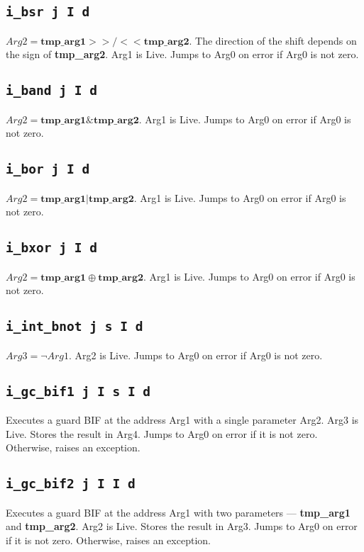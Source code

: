 \documentclass{article}
\newcommand{\tmpa}{\textbf{tmp\_arg1}}
\newcommand{\tmpb}{\textbf{tmp\_arg2}}
\newcommand{\iop}[1]{\texttt{#1}}
\begin{document}
\subsection*{\iop{i\_bsr j I d}}

$Arg2 = \tmpa{} >>/<< \tmpb{}$. The direction of the shift depends on the sign of
\tmpb{}. Arg1 is Live. Jumps to Arg0 on error if Arg0 is not zero.

\subsection*{\iop{i\_band j I d}}

$Arg2 = \tmpa{} \& \tmpb{}$. Arg1 is Live. Jumps to Arg0 on error if Arg0 is not
zero.

\subsection*{\iop{i\_bor j I d}}

$Arg2 = \tmpa{} | \tmpb{}$. Arg1 is Live. Jumps to Arg0 on error if Arg0 is not
zero.

\subsection*{\iop{i\_bxor j I d}}

$Arg2 = \tmpa{} \oplus \tmpb{}$. Arg1 is Live. Jumps to Arg0 on error if Arg0 is not
zero.

\subsection*{\iop{i\_int\_bnot j s I d}}

$Arg3 = \neg Arg1$. Arg2 is Live. Jumps to Arg0 on error if Arg0 is not zero.

\subsection*{\iop{i\_gc\_bif1 j I s I d}}

Executes a guard BIF at the address Arg1 with a single parameter Arg2. Arg3 is
Live. Stores the result in Arg4. Jumps to Arg0 on error if it is not zero.
Otherwise, raises an exception.

\subsection*{\iop{i\_gc\_bif2 j I I d}}

Executes a guard BIF at the address Arg1 with two parameters --- \tmpa{} and
\tmpb{}. Arg2 is Live. Stores the result in Arg3. Jumps to Arg0 on error if it
is not zero.  Otherwise, raises an exception.
\end{document}
